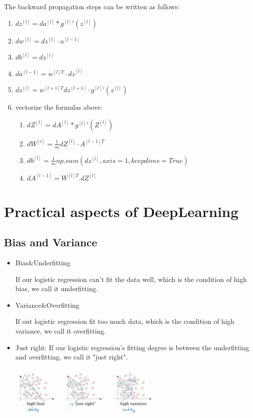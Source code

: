 \documentclass{article}
\begin{document}
The backward propagation steps can be written as follows:
\begin{enumerate}
\item $d{{z}^{[l]}}=d{{a}^{[l]}}*{{g}^{[l]}}'( {{z}^{[l]}})$
\item $d{{w}^{[l]}}=d{{z}^{[l]}}\cdot{{a}^{[l-1]}}~$
\item $d{{b}^{[l]}}=d{{z}^{[l]}}~~$
\item $d{{a}^{[l-1]}}={{w}^{\left[ l \right]T}}\cdot {{dz}^{[l]}}$
\item $d{{z}^{[l]}}={{w}^{[l+1]T}}d{{z}^{[l+1]}}\cdot{{g}^{[l]}}'( {{z}^{[l]}})~$
\item vectorize the formulas above:
\begin{enumerate}
\item $d{{Z}^{[l]}}=d{{A}^{[l]}}*{{g}^{\left[ l \right]}}'\left({{Z}^{[l]}} \right)~~$
\item $d{{W}^{[l]}}=\frac{1}{m}d{{Z}^{[l]}}\cdot{{A}^{\left[ l-1 \right]T}}$
\item $d{{b}^{[l]}}=\frac{1}{m}np.sum(d{{z}^{[l]}},axis=1,keepdims=True)$
\item $d{{A}^{[l-1]}}={{W}^{\left[ l \right]T}}.d{{Z}^{[l]}}$
\end{enumerate}
\end{enumerate}

\section{Practical aspects of DeepLearning}
\subsection{Bias and Variance}
\begin{itemize}
\item Bias\&Underfitting \par
\indent	If our logistic regression can't fit the data well, which is the condition of high bias, we call it underfitting. 
\item Variance\&Overfitting \par
\indent If out logistic regression fit too much data, which is the condition of high variance, we call it overfitting.
\item Just right:
\indent If our logistic regression's fitting degree is between the underfitting and overfitting, we call it "just right".

\includegraphics[width=7.5cm]{bias&variance.png}
\end{itemize}
\end{document}
